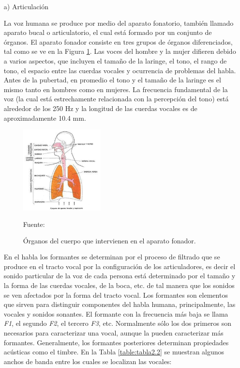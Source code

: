 \begin{enumerate}
\item[a)]Articulación
\par
La voz humana se produce por medio del aparato fonatorio, también llamado aparato bucal o articulatorio, el cual está formado por un conjunto de órganos. El aparato fonador consiste en tres grupos de órganos diferenciados, tal como se ve en la Figura \ref{fig:figura2.1}.
\vskip 0.5cm
Las voces del hombre y la mujer difieren debido a varios aspectos, que incluyen el tamaño de la laringe, el tono, el rango de tono, el espacio entre las cuerdas vocales y ocurrencia de problemas del habla. Antes de la pubertad, en promedio el tono y el tamaño de la laringe es el mismo tanto en hombres como en mujeres. La frecuencia fundamental de la voz (la cual está estrechamente relacionada con la percepción del tono) está alrededor de los 250 Hz y la longitud de las cuerdas vocales es de aproximadamente 10.4 mm.
\newpage
\begin{figure}[ht]
\begin{center}
\includegraphics[width=0.4\textwidth]{Imagenes/Cap2/image001}
\end{center}
\begin{center}
\vskip -0.5cm
\caption{\small{Órganos del cuerpo que intervienen en el aparato fonador.}}
\label{fig:figura2.1}
{\small{Fuente: \cite{luis}}}
\end{center}
\end{figure}

En el habla los formantes se determinan por el proceso de filtrado que se produce en el tracto vocal por la configuración de los articuladores, es decir el sonido particular de la voz de cada persona está determinado por el tamaño y la forma de las cuerdas vocales, de la boca, etc. de tal manera que los sonidos se ven afectados por la forma del tracto vocal.
\vskip 0.5cm
Los formantes son elementos que sirven para distinguir componentes del habla humana, principalmente, las vocales y sonidos sonantes. El formante con la frecuencia más baja se llama \textit{F1}, el segundo \textit{F2}, el tercero \textit{F3}, etc. Normalmente sólo los dos primeros son necesarios para caracterizar una vocal, aunque la pueden caracterizar más formantes. Generalmente, los formantes posteriores determinan propiedades acústicas como el timbre. En la Tabla \ref{table:tabla2.2} se muestran algunos anchos de banda entre los cuales se localizan las vocales:


\end{enumerate}

